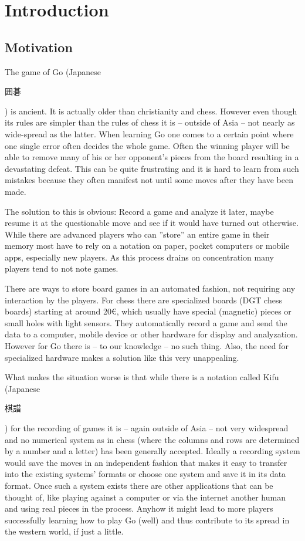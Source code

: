 
\chapter{Introduction}
	\section{Motivation}
	The game of Go (Japanese \begingroup\setmainfont{Droid Sans Japanese}\small\begin{CJK}{UTF8}{min}囲碁\end{CJK}\endgroup ) is ancient. It is actually older than christianity and chess. However even though its rules are simpler than the rules of chess it is -- outside of Asia -- not nearly as wide-spread as the latter. When learning Go one comes to a certain point where one single error often decides the whole game. Often the winning player will be able to remove many of his or her opponent's pieces from the board resulting in a devastating defeat. This can be quite frustrating and it is hard to learn from such mistakes because they often manifest not until some moves after they have been made.

	The solution to this is obvious: Record a game and analyze it later, maybe resume it at the questionable move and see if it would have turned out otherwise. While there are advanced players who can ''store'' an entire game in their memory most have to rely on a notation on paper, pocket computers or mobile apps, especially new players. As this process drains on concentration many players tend to not note games.

	There are ways to store board games in an automated fashion, not requiring any interaction by the players. For chess there are specialized boards (DGT chess boards) starting at around 20€, which usually have special (magnetic) pieces\cite{bulsink2001device} or small holes with light sensors. They automatically record a game and send the data to a computer, mobile	device or other hardware for display and analyzation. However for Go there is -- to our knowledge -- no such thing. Also, the need for specialized hardware makes a solution like this very unappealing.

	What makes the situation worse is that while there is a notation called Kifu (Japanese \begingroup\setmainfont{Droid Sans Japanese}\small\begin{CJK}{UTF8}{min}棋譜\end{CJK}\endgroup ) for the recording of games it is -- again outside of Asia -- not very widespread and no numerical system as in chess (where the columns and rows are determined by a number and a letter) has been generally accepted. Ideally a recording system would save the moves in an independent fashion that makes it easy to transfer into the existing systems' formats or choose one system and save it in its data format. Once such a system exists there are other applications that can be thought of, like playing against a computer or via the internet another human and using real pieces in the process. Anyhow it might lead to more players successfully learning how to play Go (well) and thus contribute to its spread in the western world, if just a little. %

